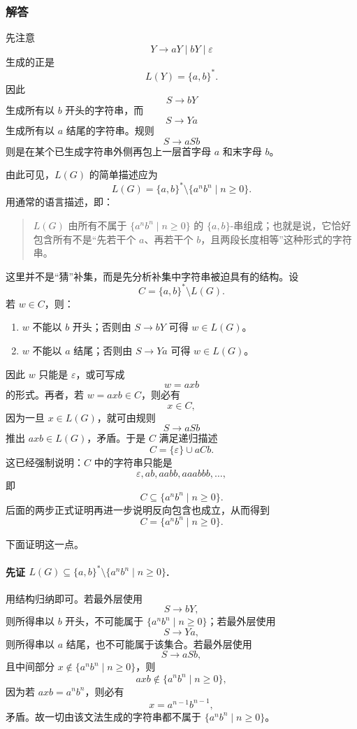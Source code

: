 \begin{answerred}
\subsubsection*{解答}

先注意
\[
    Y\to aY\mid bY\mid \varepsilon
\]
生成的正是
\[
    L(Y)=\{a,b\}^*.
\]
因此
\[
    S\to bY
\]
生成所有以 $b$ 开头的字符串，而
\[
    S\to Ya
\]
生成所有以 $a$ 结尾的字符串。规则
\[
    S\to aSb
\]
则是在某个已生成字符串外侧再包上一层首字母 $a$ 和末字母 $b$。

由此可见，$L(G)$ 的简单描述应为
\[
    L(G)=\{a,b\}^*\setminus \{a^n b^n\mid n\ge 0\}.
\]
用通常的语言描述，即：

\begin{quote}
    $L(G)$ 由所有不属于 $\{a^n b^n\mid n\ge 0\}$ 的 $\{a,b\}$-串组成；也就是说，它恰好包含所有不是“先若干个 $a$、再若干个 $b$，且两段长度相等”这种形式的字符串。
\end{quote}

这里并不是“猜”补集，而是先分析补集中字符串被迫具有的结构。设
\[
    C=\{a,b\}^*\setminus L(G).
\]
若 $w\in C$，则：
\begin{enumerate}[label=(\roman*), leftmargin=2.5em]
    \item $w$ 不能以 $b$ 开头；否则由 $S\to bY$ 可得 $w\in L(G)$。
    \item $w$ 不能以 $a$ 结尾；否则由 $S\to Ya$ 可得 $w\in L(G)$。
\end{enumerate}
因此 $w$ 只能是 $\varepsilon$，或可写成
\[
    w=axb
\]
的形式。再者，若 $w=axb\in C$，则必有
\[
    x\in C,
\]
因为一旦 $x\in L(G)$，就可由规则
\[
    S\to aSb
\]
推出 $axb\in L(G)$，矛盾。于是 $C$ 满足递归描述
\[
    C=\{\varepsilon\}\cup aCb.
\]
这已经强制说明：$C$ 中的字符串只能是
\[
    \varepsilon,ab,aabb,aaabbb,\dots,
\]
即
\[
    C\subseteq \{a^n b^n\mid n\ge 0\}.
\]
后面的两步正式证明再进一步说明反向包含也成立，从而得到
\[
    C=\{a^n b^n\mid n\ge 0\}.
\]

下面证明这一点。

\paragraph{先证 $L(G)\subseteq \{a,b\}^*\setminus \{a^n b^n\mid n\ge 0\}$.}
用结构归纳即可。若最外层使用
\[
    S\to bY,
\]
则所得串以 $b$ 开头，不可能属于 $\{a^n b^n\mid n\ge 0\}$；若最外层使用
\[
    S\to Ya,
\]
则所得串以 $a$ 结尾，也不可能属于该集合。若最外层使用
\[
    S\to aSb,
\]
且中间部分 $x\notin \{a^n b^n\mid n\ge 0\}$，则
\[
    axb\notin \{a^n b^n\mid n\ge 0\},
\]
因为若 $axb=a^n b^n$，则必有
\[
    x=a^{n-1}b^{n-1},
\]
矛盾。故一切由该文法生成的字符串都不属于 $\{a^n b^n\mid n\ge 0\}$。


\end{answerred}
